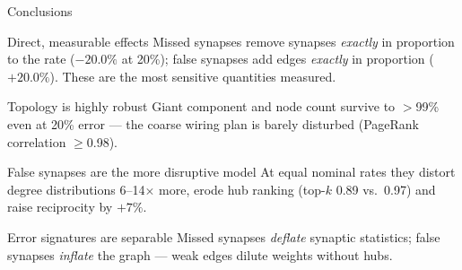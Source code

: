 \documentclass[aspectratio=169,11pt]{beamer}
\begin{document}
\begin{frame}{Conclusions}
\begin{block}{Direct, measurable effects}
  \footnotesize
  Missed synapses remove synapses \emph{exactly} in proportion to the rate
  ($-20.0\%$ at 20\%); false synapses add edges \emph{exactly} in proportion
  ($+20.0\%$).  These are the most sensitive quantities measured.
\end{block}
\begin{block}{Topology is highly robust}
  \footnotesize
  Giant component and node count survive to $>$99\% even at 20\% error ---
  the coarse wiring plan is barely disturbed (PageRank correlation $\ge$0.98).
\end{block}
\begin{block}{False synapses are the more disruptive model}
  \footnotesize
  At equal nominal rates they distort degree distributions 6--14$\times$ more,
  erode hub ranking (top-$k$ 0.89 vs.\ 0.97) and raise reciprocity by $+7\%$.
\end{block}
\begin{block}{Error signatures are separable}
  \footnotesize
  Missed synapses \emph{deflate} synaptic statistics; false synapses
  \emph{inflate} the graph --- weak edges dilute weights without hubs.
\end{block}
\end{frame}
\end{document}
